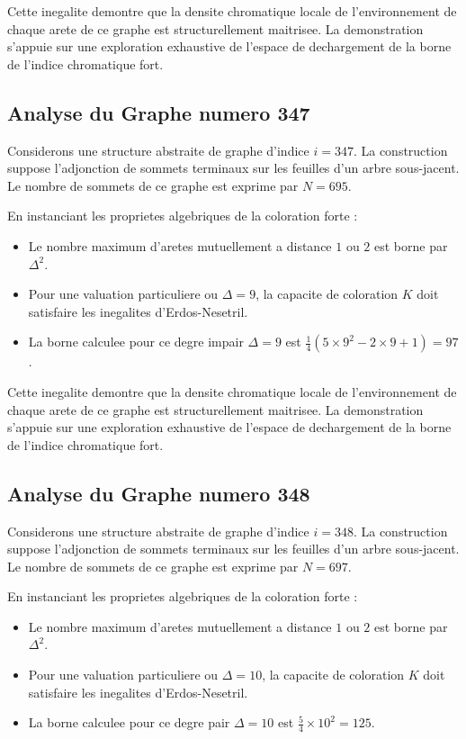 \documentclass[11pt,a4paper]{article}
\begin{document}
Cette inegalite demontre que la densite chromatique locale de l'environnement de chaque arete de ce graphe est structurellement maitrisee. La demonstration s'appuie sur une exploration exhaustive de l'espace de dechargement de la borne de l'indice chromatique fort.

\subsection{Analyse du Graphe numero 347}
Considerons une structure abstraite de graphe d'indice $i = 347$. La construction suppose l'adjonction de sommets terminaux sur les feuilles d'un arbre sous-jacent. Le nombre de sommets de ce graphe est exprime par $N = 695$.

En instanciant les proprietes algebriques de la coloration forte :
\begin{itemize}
\item Le nombre maximum d'aretes mutuellement a distance $1$ ou $2$ est borne par $\Delta^2$.
\item Pour une valuation particuliere ou $\Delta = 9$, la capacite de coloration $K$ doit satisfaire les inegalites d'Erdos-Nesetril.
\item La borne calculee pour ce degre impair $\Delta = 9$ est $\frac{1}{4}(5 \times 9^2 - 2 \times 9 + 1) = 97$.
\end{itemize}

Cette inegalite demontre que la densite chromatique locale de l'environnement de chaque arete de ce graphe est structurellement maitrisee. La demonstration s'appuie sur une exploration exhaustive de l'espace de dechargement de la borne de l'indice chromatique fort.

\subsection{Analyse du Graphe numero 348}
Considerons une structure abstraite de graphe d'indice $i = 348$. La construction suppose l'adjonction de sommets terminaux sur les feuilles d'un arbre sous-jacent. Le nombre de sommets de ce graphe est exprime par $N = 697$.

En instanciant les proprietes algebriques de la coloration forte :
\begin{itemize}
\item Le nombre maximum d'aretes mutuellement a distance $1$ ou $2$ est borne par $\Delta^2$.
\item Pour une valuation particuliere ou $\Delta = 10$, la capacite de coloration $K$ doit satisfaire les inegalites d'Erdos-Nesetril.
\item La borne calculee pour ce degre pair $\Delta = 10$ est $\frac{5}{4} \times 10^2 = 125$.
\end{itemize}
\end{document}
